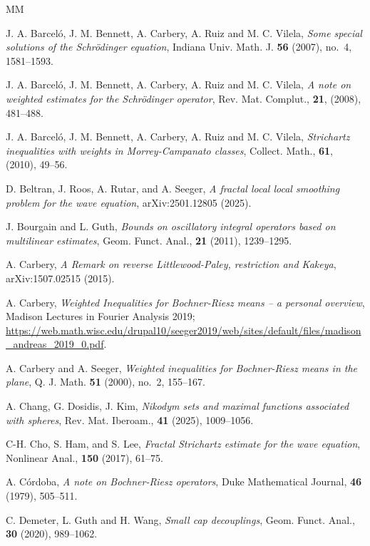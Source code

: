 \documentclass[11pt]{amsart}
\theoremstyle{definition}
\theoremstyle{remark}
\begin{document}
\begin{thebibliography}{MM}

 J. A. Barcel\'o, J. M. Bennett, A. Carbery, A. Ruiz and M. C. Vilela,
\textit{Some special solutions of the Schr\"odinger equation},
Indiana Univ. Math. J. {\bf 56} (2007), no.~4, 1581--1593.

 J. A. Barcel\'o, J. M. Bennett, A. Carbery, A. Ruiz and M. C. Vilela,
\textit{A note on weighted estimates for the Schr\"odinger operator},
Rev. Mat. Complut., \textbf{21}, (2008), 481--488.

 J. A. Barcel\'o, J. M. Bennett, A. Carbery, A. Ruiz and M. C. Vilela,
\textit{Strichartz inequalities with weights in Morrey-Campanato classes}, 
Collect. Math., \textbf{61}, (2010), 49--56.

 D. Beltran, J. Roos, A. Rutar, and A. Seeger,
\textit{A fractal local local smoothing problem for the wave equation},
arXiv:2501.12805 (2025).

 J. Bourgain and L. Guth,
\textit{Bounds on oscillatory integral operators based on multilinear estimates}, 
Geom. Funct. Anal., \textbf{21} (2011), 1239--1295.

 A.  Carbery,
\textit{A Remark on reverse Littlewood-Paley, restriction and Kakeya}, 
arXiv:1507.02515 (2015).

 A. Carbery, 
\textit{Weighted Inequalities for Bochner-Riesz means -- a personal overview}, 
Madison Lectures in Fourier Analysis 2019; \url{https://web.math.wisc.edu/drupal10/seeger2019/web/sites/default/files/madison_andreas_2019_0.pdf}.

 A. Carbery and A. Seeger, 
\textit{Weighted inequalities for Bochner-Riesz means in the plane}, 
Q. J. Math. {\bf 51} (2000), no.~2, 155--167.

 A. Chang, G. Dosidis, J. Kim,
\textit{Nikodym sets and maximal functions associated with spheres},
Rev. Mat. Iberoam., \textbf{41} (2025), 1009--1056.

 C-H. Cho, S. Ham, and S. Lee,
\textit{Fractal Strichartz estimate for the wave equation},
Nonlinear Anal., \textbf{150} (2017), 61--75.

 A. C\'ordoba, 
\textit{A note on Bochner-Riesz operators}, 
Duke Mathematical Journal, \textbf{46} (1979), 505--511.

 C. Demeter, L. Guth and H. Wang, 
\textit{Small cap decouplings}, 
Geom. Funct. Anal., {\bf 30} (2020), 989--1062.


\end{thebibliography}
\end{document}
